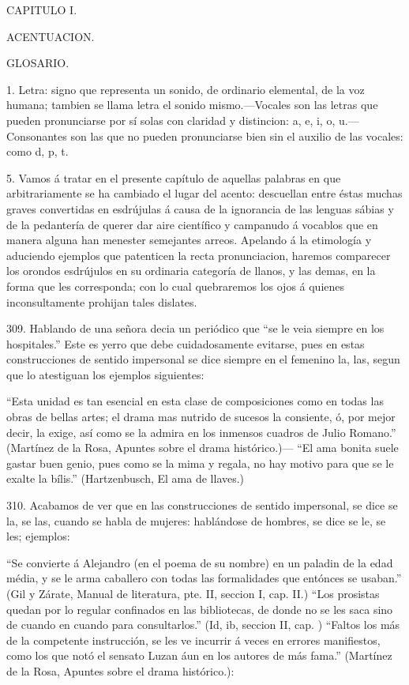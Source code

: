 ﻿\documentclass{book}
\begin{document}
CAPITULO I.

ACENTUACION.

GLOSARIO.

1. Letra: signo que representa un sonido, de ordinario elemental, de la voz humana; tambien se llama letra el sonido mismo.---Vocales son las letras que pueden pronunciarse por sí solas con claridad y distincion: a, e, i, o, u.---Consonantes son las que no pueden pronunciarse bien sin el auxilio de las vocales: como d, p, t.

5. Vamos á tratar en el presente capítulo de aquellas palabras en que arbitrariamente se ha cambiado el lugar del acento: descuellan entre éstas muchas graves convertidas en esdrújulas á causa de la ignorancia de las lenguas sábias y de la pedantería de querer dar aire científico y campanudo á vocablos que en manera alguna han menester semejantes arreos. Apelando á la etimología y aduciendo ejemplos que patenticen la recta pronunciacion, haremos comparecer los orondos esdrújulos en su ordinaria categoría de llanos, y las demas, en la forma que les corresponda; con lo cual quebraremos los ojos á quienes inconsultamente prohijan tales dislates.



309. Hablando de una señora decia un periódico que “se le veia siempre en los hospitales.” Este es yerro que debe cuidadosamente evitarse, pues en estas construcciones de sentido impersonal se dice siempre en el femenino la, las, segun que lo atestiguan los ejemplos siguientes:

“Esta unidad es tan esencial en esta clase de composiciones como en todas las obras de bellas artes; el drama mas nutrido de sucesos la consiente, ó, por mejor decir, la exige, así como se la admira en los inmensos cuadros de Julio Romano.” (Martínez de la Rosa, Apuntes sobre el drama histórico.)--- “El  ama bonita suele gastar buen genio, pues como se la mima y regala, no hay motivo para que se le exalte la bílis.” (Hartzenbusch, El ama de llaves.)

310. Acabamos de ver que en las construcciones de sentido impersonal, se dice se la, se las, cuando se habla de mujeres: hablándose de hombres, se dice se le, se les; ejemplos:

“Se convierte á Alejandro (en el poema de su nombre) en un paladin de la edad média, y se le arma caballero con todas las formalidades que entónces se usaban.” (Gil y Zárate, Manual de literatura, pte. II, seccion I, cap. II.) “Los prosistas quedan por lo regular confinados en las bibliotecas, de donde no se les saca sino de cuando en cuando para consultarlos.” (Id, ib, seccion II, cap. ) “Faltos los más de la competente instrucción, se les ve incurrir á veces en errores manifiestos, como los que notó el sensato Luzan áun en los autores de más fama.” (Martínez de la Rosa, Apuntes sobre el drama histórico.): 
\end{document}
